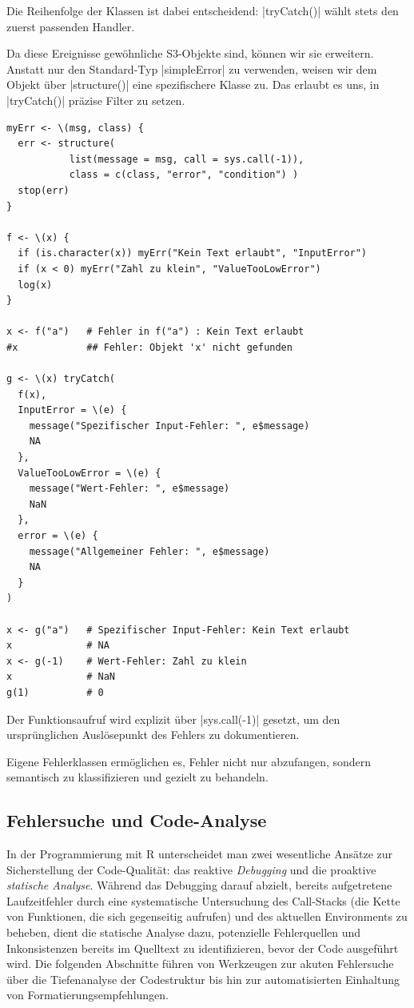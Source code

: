 \documentclass[10pt,twocolumn]{scrartcl}
\renewcommand{\lstinline}{\mycoloredinline}
\begin{document}
Die Reihenfolge der Klassen ist dabei entscheidend: \lstinline|tryCatch()| wählt stets den zuerst passenden Handler.

Da diese Ereignisse gewöhnliche S3-Objekte sind, können wir sie erweitern. Anstatt nur den Standard-Typ \lstinline|simpleError| zu verwenden, weisen wir dem Objekt über \lstinline|structure()| eine spezifischere Klasse zu. Das erlaubt es uns, in \lstinline|tryCatch()| präzise Filter zu setzen.

\begin{lstlisting}
myErr <- \(msg, class) {
  err <- structure(
           list(message = msg, call = sys.call(-1)),
           class = c(class, "error", "condition") )
  stop(err)
}

f <- \(x) {
  if (is.character(x)) myErr("Kein Text erlaubt", "InputError")
  if (x < 0) myErr("Zahl zu klein", "ValueTooLowError")
  log(x)
}

x <- f("a")   # Fehler in f("a") : Kein Text erlaubt
#x            ## Fehler: Objekt 'x' nicht gefunden

g <- \(x) tryCatch(
  f(x),
  InputError = \(e) { 
    message("Spezifischer Input-Fehler: ", e$message)
    NA
  },
  ValueTooLowError = \(e) {
    message("Wert-Fehler: ", e$message)
    NaN
  },
  error = \(e) { 
    message("Allgemeiner Fehler: ", e$message)
    NA
  }
)

x <- g("a")   # Spezifischer Input-Fehler: Kein Text erlaubt
x             # NA
x <- g(-1)    # Wert-Fehler: Zahl zu klein
x             # NaN
g(1)          # 0
\end{lstlisting}

Der Funktionsaufruf wird explizit über \lstinline|sys.call(-1)| gesetzt, um den ursprünglichen Auslösepunkt des Fehlers zu dokumentieren.

Eigene Fehlerklassen ermöglichen es, Fehler nicht nur abzufangen, sondern semantisch zu klassifizieren und gezielt zu behandeln.


\subsection{Fehlersuche und Code-Analyse}

In der Programmierung mit R unterscheidet man zwei wesentliche Ansätze zur Sicherstellung der Code-Qualität: das reaktive \emph{Debugging} und die proaktive \emph{statische Analyse}. Während das Debugging darauf abzielt, bereits aufgetretene Laufzeitfehler durch eine systematische Untersuchung des Call-Stacks (die Kette von Funktionen, die sich gegenseitig aufrufen) und des aktuellen Environments zu beheben, dient die statische Analyse dazu, potenzielle Fehlerquellen und Inkonsistenzen bereits im Quelltext zu identifizieren, bevor der Code ausgeführt wird. Die folgenden Abschnitte führen von Werkzeugen zur akuten Fehlersuche über die Tiefenanalyse der Codestruktur bis hin zur automatisierten Einhaltung von Formatierungsempfehlungen.
\end{document}
